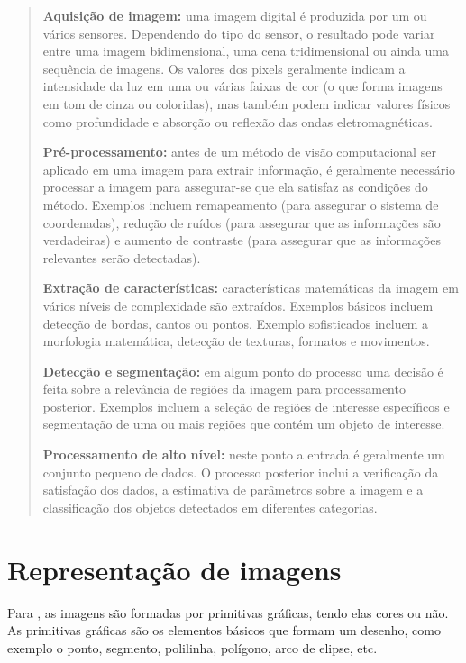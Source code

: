\documentclass{article}
\begin{document}
     \begin{quotation}
     
    \textbf{Aquisição de imagem:} uma imagem digital é produzida por um ou vários sensores. Dependendo do tipo do sensor, o resultado pode variar entre uma imagem bidimensional, uma cena tridimensional ou ainda uma sequência de imagens. Os valores dos pixels geralmente indicam a intensidade da luz em uma ou várias faixas de cor (o que forma imagens em tom de cinza ou coloridas), mas também podem indicar valores físicos como profundidade e absorção ou reflexão das ondas eletromagnéticas.
    
    \textbf{Pré-processamento:} antes de um método de visão computacional ser aplicado em uma imagem para extrair informação, é geralmente necessário processar a imagem para assegurar-se que ela satisfaz as condições do método. Exemplos incluem remapeamento (para assegurar o sistema de coordenadas), redução de ruídos (para assegurar que as informações são verdadeiras) e aumento de contraste (para assegurar que as informações relevantes serão detectadas).
    
    \textbf{Extração de características:} características matemáticas da imagem em vários níveis de complexidade são extraídos. Exemplos básicos incluem detecção de bordas, cantos ou pontos. Exemplo sofisticados incluem a morfologia matemática, detecção de texturas, formatos e movimentos.
    
    \textbf{Detecção e segmentação:} em algum ponto do processo uma decisão é feita sobre a relevância de regiões da imagem para processamento posterior. Exemplos incluem a seleção de regiões de interesse específicos e segmentação de uma ou mais regiões que contém um objeto de interesse.
    
    \textbf{Processamento de alto nível:} neste ponto a entrada é geralmente um conjunto pequeno de dados. O processo posterior inclui a verificação da satisfação dos dados, a estimativa de parâmetros sobre a imagem e a classificação dos objetos detectados em diferentes categorias.

 \end{quotation}
    
\section{Representação de imagens}
    Para , as imagens são formadas por primitivas gráficas, tendo elas cores ou não. As primitivas gráficas são os elementos básicos que formam um desenho, como exemplo o ponto, segmento, polilinha, polígono, arco de elipse, etc.
    
\end{document}
